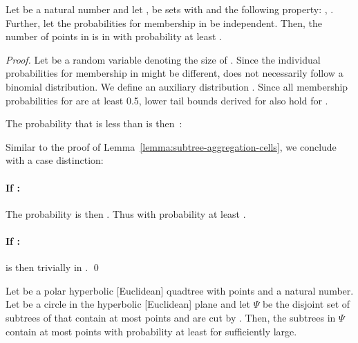 \documentclass{llncs}
\begin{document}
\newcommand{\uaqcset}{\ensuremath{\Upsilon}}
\newcommand{\subtreeset}{\ensuremath{\mathcal{\Psi}}\xspace}
\begin{lemma}
Let  be a natural number and let ,  be sets with  and the following property: , .
Further, let the probabilities for membership in  be independent.
Then, the number of points in  is in  with probability at least .
\label{lemma:half-prob-set}
\end{lemma}
\begin{proof}
Let  be a random variable denoting the size of .
Since the individual probabilities for membership in  might be different,  does not necessarily follow a binomial distribution.
We define an auxiliary distribution .
Since all membership probabilities for  are at least 0.5, lower tail bounds derived for  also hold for .

The probability that  is less than  is then~\cite{Hoe63}:


Similar to the proof of Lemma~\ref{lemma:subtree-aggregation-cells}, we conclude with a case distinction:
\paragraph{If :}
The probability  is then .
Thus  with probability at least .

\paragraph{If :}
 is then trivially in .
\qed
\end{proof}


\begin{lemma}
Let  be a polar hyperbolic [Euclidean] quadtree with  points and  a natural number.
Let  be a circle in the hyperbolic [Euclidean] plane and let \subtreeset be the disjoint set of subtrees of  that contain at most  points and are cut by .
Then, the subtrees in \subtreeset contain at most  points with probability at least  for  sufficiently large.
\label{lemma:ring-root}
\end{lemma}
\end{document}
